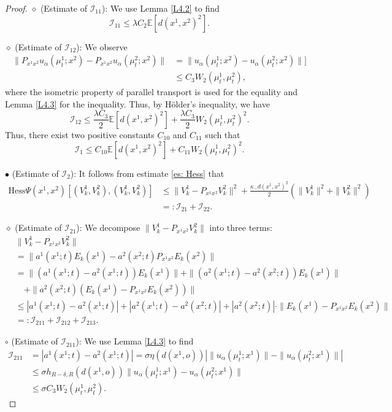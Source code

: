 \documentclass[11pt]{amsart}
\newcommand{\bE}{\mathbb{E}}
\newcommand{\p}{o}%
\newcommand{\dist}{d}%
\begin{document}
\begin{proof}
$\diamond$ (Estimate of $\mathcal I_{11}$): We use Lemma \ref{L4.2} to find
\[
\mathcal I_{11} \leq \lambda C_2 \bE [d(x^1,x^2)^2].
\]

$\diamond$ (Estimate of $\mathcal I_{12}$): We observe
\begin{align*} 
\|P_{x^1x^2}u_\alpha(\mu_t^1;x^2)-P_{x^1x^2}u_\alpha(\mu_t^2;x^2)\| & = \| u_\alpha(\mu_t^1;x^2)-u_\alpha(\mu_t^2;x^2)\|] \\
& \leq  C_3 W_2(\mu_t^1,\mu_t^2),
\end{align*}
where the isometric property of parallel transport is used for the equality and Lemma \ref{L4.3} for the inequality. Thus, by H\"older's inequality, we have
\[
\mathcal I_{12} \leq \frac{\lambda C_3}{2} \bE[ d(x^1,x^2)^2] + \frac{\lambda C_3}{2} W_2(\mu_t^1,\mu_t^2)^2.
\]
Thus, there exist two positive constants $C_{10}$ and $C_{11}$ such that 
\[
\mathcal I_1 \leq C_{10} \bE[ d(x^1,x^2)^2] + C_{11} W_2(\mu_t^1,\mu_t^2)^2.
\]

\noindent $\bullet$ (Estimate of $\mathcal I_2$): It follows from estimate  \eqref{es: Hess} that 
\begin{align*} 
\mathrm{Hess}\Psi(x^1, x^2)[(V_k^1, V_k^2), (V_k^1, V_k^2)]&\leq \|V_k^1-P_{x^1x^2}V_k^2\|^2+\frac{\kappa_-\dist(x^1,x^2)^2}{2}(\|V_k^1\|^2+\|V_k^2\|^2) \\
& =: \mathcal I_{21}+ \mathcal I_{22}.
\end{align*}

$\diamond$ (Estimate of $\mathcal I_{21}$): We decompose $\|V_k^1-P_{x^1x^2}V_k^2\|$ into three terms:
\begin{align*}
&\|V_k^1-P_{x^1x^2}V_k^2\|\\
&=\|a^1(x^1;t)E_k(x^1)-a^2(x^2;t)P_{x^1x^2}E_k(x^2)\| \\
&=\|(a^1(x^1;t)-a^2(x^1;t))E_k(x^1)\|+\|(a^2(x^1;t)-a^2(x^2;t))E_k(x^1)\| \\
&\quad +\|a^2(x^2;t)(E_k(x^1)-P_{x^1x^2}E_k(x^2))\|\\
&\leq |a^1(x^1;t)-a^2(x^1;t)|+|a^2(x^1;t)-a^2(x^2;t)|+|a^2(x^2;t)|\cdot \|E_k(x^1)-P_{x^1x^2}E_k(x^2)\| \\
&= : \mathcal I_{211} + \mathcal I_{212} + \mathcal I_{213}.
\end{align*}


$\circ$ (Estimate of $\mathcal I_{211}$):  We use Lemma \ref{L4.3} to find 
\begin{align*}
\mathcal I_{211} & = |a^1(x^1;t)-a^2(x^1;t)|=\sigma\eta(\dist(x^1, \p))\left|\|u_\alpha(\mu_t^1;x^1)\|-\|u_\alpha(\mu_t^2;x^1)\|\right|\\
&\leq\sigma h_{R-\delta, R}(\dist(x^1, \p))\|u_\alpha(\mu_t^1;x^1)-u_\alpha(\mu_t^2;x^1)\|\\
&\leq \sigma C_{3}W_2(\mu_t^1,\mu_t^2).
\end{align*}


\end{proof}
\end{document}
